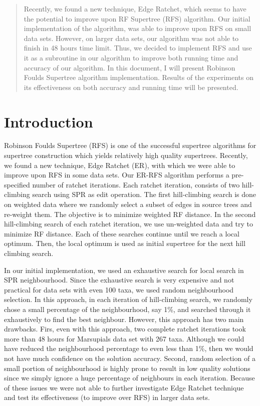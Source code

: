 \documentclass[12pt]{article}
\begin{document}
\maketitle

\begin{abstract}
Recently, we found a new technique, Edge Ratchet, which seems to have the potential to improve upon RF Supertree (RFS) algorithm. Our initial implementation of the algorithm, was able to improve upon RFS on small data sets. However, on larger data sets, our algorithm was not able to finish in 48 hours time limit. Thus, we decided to implement RFS and use it as a subroutine in our algorithm to improve both running time and accuracy of our algorithm. In this document, I will present Robinson Foulds Supertree algorithm implementation. Results of the experiments on its effectiveness on both accuracy and running time will be presented.


  
\end{abstract}

\section{Introduction}
Robinson Foulds Supertree (RFS) is one of the successful supertree algorithms for supertree construction which yields relatively high quality supertrees. Recently, we found a new technique, Edge Ratchet (ER), with which we were able to improve upon RFS in some data sets. Our ER-RFS algorithm performs a pre-specified number of ratchet iterations. Each ratchet iteration, consists of two hill-climbing search using SPR as edit operation. The first hill-climbing search is done on weighted data where we randomly select a subset of edges in source trees and re-weight them. The objective is to minimize weighted RF distance. In the second hill-climbing search of each ratchet iteration, we use un-weighted data and try to minimize RF distance. Each of these searches continue until we reach a local optimum. Then, the local optimum is used as initial supertree for the next hill climbing search.   

In our initial implementation, we used an exhaustive search for local search in SPR neighbourhood. Since the exhaustive search is very expensive and not practical for data sets with even 100 taxa, we used random neighbourhood selection. In this approach, in each iteration of hill-climbing search, we randomly chose a small percentage of the neighbourhood, say 1\%, and searched through it exhaustively to find the best neighbour. However, this approach has two main drawbacks. Firs, even with this approach, two complete ratchet iterations took more than 48 hours for Marsupials data set with 267 taxa. Although we could have reduced the neighbourhood percentage to even less than 1\%, then we would not have much confidence on the solution accuracy. Second, random selection of a small portion of neighbourhood is highly prone to result in low quality solutions since we simply ignore a huge percentage of neighbours in each iteration. Because of these issues we were not able  to further investigate Edge Ratchet technique and test its effectiveness (to improve over RFS) in larger data sets. 
\end{document}
